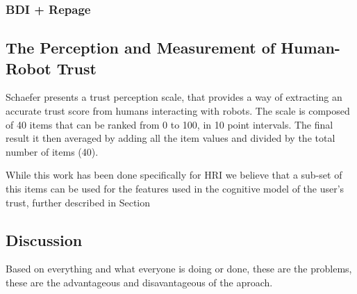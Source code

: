\subsubsection{BDI + Repage}
\label{subsubsec:Related work:Trust Models:BDI + Repage}

\subsection{The Perception and Measurement of Human-Robot Trust}
\label{subsec:Related work:The Perception and Measurement of Human-Robot Trust}

Schaefer\cite{Schaefer2009} presents a trust perception scale, that provides a way of extracting an accurate trust score from humans interacting with robots. The scale is composed of 40 items that can be ranked from 0 to 100, in 10 point intervals. The final result it then averaged by adding all the item values and divided by the total number of items (40).



While this work has been done specifically for \ac{HRI} we believe that a sub-set of this items can be used for the features used in the cognitive model of the user's trust, further described in Section %






\subsection{Discussion}
\label{subsec:RelWorkDiscussion}

Based on everything and what everyone is doing or done, these are the problems, these are the advantageous and disavantageous of the aproach.